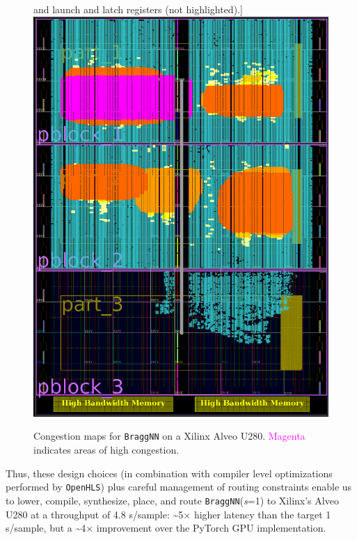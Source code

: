 \documentclass[10pt]{sig-alternate}
\begin{document}
\begin{figure}[tbh]
and launch and latch registers (not highlighted).\label{fig:OpenHLS-framework-overview.-2-1-1}]{\centering{}\includegraphics[width=1\columnwidth]{figures/withpblocks}}\caption{Congestion maps for \texttt{BraggNN} on a Xilinx Alveo U280. \textcolor{magenta}{Magenta}
indicates areas of high congestion.\label{fig:OpenHLS-framework-overview.-2}}
\end{figure}

Thus, these design choices (in combination
with compiler level optimizations performed by \texttt{OpenHLS})
plus careful management of routing constraints enable us to lower,
compile, synthesize, place, and route \texttt{BraggNN}(\emph{s}\/=1) to Xilinx's
Alveo U280 at a throughput of 4.8 \textmu s/sample: \textasciitilde 5$\times$
higher latency than the target 1 \textmu s/sample, but a \textasciitilde 4$\times$
improvement over the PyTorch GPU implementation.
\end{document}
